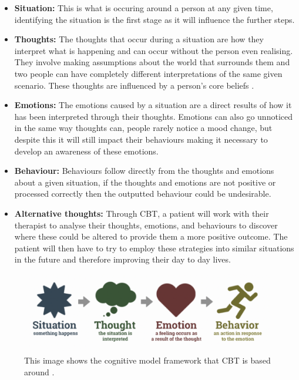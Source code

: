 \documentclass{l4proj}
\begin{document}
\begin{itemize}
    \item \textbf{Situation:} This is what is occuring around a person at any given time, identifying the situation is the first stage as it will influence the further steps.
    \item \textbf{Thoughts:} The thoughts that occur during a situation are how they interpret what is happening and can occur without the person even realising. They involve making assumptions about the world that surrounds them and two people can have completely different interpretations of the same given scenario. These thoughts are influenced by a person's core beliefs \citep{therapist_aid_psychoeducation}. 
    \item \textbf{Emotions:} The emotions caused by a situation are a direct results of how it has been interpreted through their thoughts. Emotions can also go unnoticed in the same way thoughts can, people rarely notice a mood change, but despite this it will still impact their behaviours making it necessary to develop an awareness of these emotions.
    \item \textbf{Behaviour:} Behaviours follow directly from the thoughts and emotions about a given situation, if the thoughts and emotions are not positive or processed correctly then the outputted behaviour could be undesirable.
    \item \textbf{Alternative thoughts:} Through CBT, a patient will work with their therapist to analyse their thoughts, emotions, and behaviours to discover where these could be altered to provide them a more positive outcome. The patient will then have to try to employ these strategies into similar situations in the future and therefore improving their day to day lives.
\end{itemize}

\begin{figure}[h!]
    \begin{centering}
    \includegraphics[scale=0.5]{images/cognitive-model.png}
    \caption{This image shows the cognitive model framework that CBT is based around \citep{therapist_aid_psychoeducation}.}
    \label{fig: CognitiveModel}
    \end{centering}
\end{figure}
\end{document}
